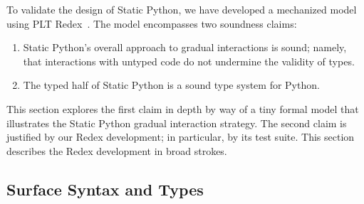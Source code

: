 \documentclass[english,cleveref,submission]{programming}
\newcommand{\SP}{Static Python}
\begin{document}


To validate the design of \SP{}, we have developed a mechanized model using PLT
Redex~\cite{kcdeffmrtf-popl-2012}.
The model encompasses two soundness claims:
\begin{enumerate}
  \item
    \SP{}'s overall approach to gradual interactions is sound; namely, that interactions
    with untyped code do not undermine the validity of types.
  \item
    The typed half of \SP{} is a sound type system for Python.
\end{enumerate}
This section explores the first claim in depth by way of a tiny formal model
that illustrates the \SP{} gradual interaction strategy.
The second claim is justified by our Redex development;
in particular, by its test suite.
This section describes the Redex development in broad strokes.


\subsection{Surface Syntax and Types}
\end{document}
